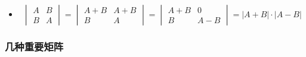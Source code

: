 \documentclass[./linear_algebra.tex]{subfiles}
\begin{document}
\begin{enumerate}
\begin{itemize}
            \item
            \[
                \begin{vmatrix}
                    A & B \\
                    B & A
                \end{vmatrix}
                = \begin{vmatrix}
                      A + B & A + B \\
                      B     & A
                \end{vmatrix}
                = \begin{vmatrix}
                      A + B & 0     \\
                      B     & A - B
                \end{vmatrix}
                = |A + B| \cdot |A - B|
            \]
        \end{itemize}
    \end{enumerate}

    \subsubsection{几种重要矩阵}
\end{document}
